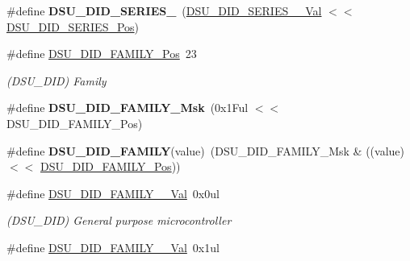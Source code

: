 \begin{DoxyCompactItemize}
\item 
\hypertarget{group___s_a_m_l21___d_s_u_ga0393d52bdee9a481f611e749fad390ec}{}\#define {\bfseries D\+S\+U\+\_\+\+D\+I\+D\+\_\+\+S\+E\+R\+I\+E\+S\+\_}~(\hyperlink{group___s_a_m_l21___d_s_u_ga5b1ab97381d29e6d852f6ef0aec8f479}{D\+S\+U\+\_\+\+D\+I\+D\+\_\+\+S\+E\+R\+I\+E\+S\+\_\+\_\+\+Val}          $<$$<$ \hyperlink{group___s_a_m_l21___d_s_u_ga7f9f64f65c0ec3d507ba5bc03b1a9b68}{D\+S\+U\+\_\+\+D\+I\+D\+\_\+\+S\+E\+R\+I\+E\+S\+\_\+\+Pos})\label{group___s_a_m_l21___d_s_u_ga0393d52bdee9a481f611e749fad390ec}

\item 
\hypertarget{group___s_a_m_l21___d_s_u_ga738ead915cfef1cb2261b900bc2125e7}{}\#define \hyperlink{group___s_a_m_l21___d_s_u_ga738ead915cfef1cb2261b900bc2125e7}{D\+S\+U\+\_\+\+D\+I\+D\+\_\+\+F\+A\+M\+I\+L\+Y\+\_\+\+Pos}~23\label{group___s_a_m_l21___d_s_u_ga738ead915cfef1cb2261b900bc2125e7}

\begin{DoxyCompactList}\small\item\em (D\+S\+U\+\_\+\+D\+I\+D) Family \end{DoxyCompactList}\item 
\hypertarget{group___s_a_m_l21___d_s_u_gafadbeccaa25afb79e44bfa3e1585c116}{}\#define {\bfseries D\+S\+U\+\_\+\+D\+I\+D\+\_\+\+F\+A\+M\+I\+L\+Y\+\_\+\+Msk}~(0x1\+Ful $<$$<$ D\+S\+U\+\_\+\+D\+I\+D\+\_\+\+F\+A\+M\+I\+L\+Y\+\_\+\+Pos)\label{group___s_a_m_l21___d_s_u_gafadbeccaa25afb79e44bfa3e1585c116}

\item 
\hypertarget{group___s_a_m_l21___d_s_u_ga60b98d79fd8846339905b75d8df68abb}{}\#define {\bfseries D\+S\+U\+\_\+\+D\+I\+D\+\_\+\+F\+A\+M\+I\+L\+Y}(value)~(D\+S\+U\+\_\+\+D\+I\+D\+\_\+\+F\+A\+M\+I\+L\+Y\+\_\+\+Msk \& ((value) $<$$<$ \hyperlink{group___s_a_m_l21___d_s_u_ga738ead915cfef1cb2261b900bc2125e7}{D\+S\+U\+\_\+\+D\+I\+D\+\_\+\+F\+A\+M\+I\+L\+Y\+\_\+\+Pos}))\label{group___s_a_m_l21___d_s_u_ga60b98d79fd8846339905b75d8df68abb}

\item 
\hypertarget{group___s_a_m_l21___d_s_u_gaa68390a3dd287f0f36e30d40994bcb1e}{}\#define \hyperlink{group___s_a_m_l21___d_s_u_gaa68390a3dd287f0f36e30d40994bcb1e}{D\+S\+U\+\_\+\+D\+I\+D\+\_\+\+F\+A\+M\+I\+L\+Y\+\_\+\_\+\+Val}~0x0ul\label{group___s_a_m_l21___d_s_u_gaa68390a3dd287f0f36e30d40994bcb1e}

\begin{DoxyCompactList}\small\item\em (D\+S\+U\+\_\+\+D\+I\+D) General purpose microcontroller \end{DoxyCompactList}\item 
\hypertarget{group___s_a_m_l21___d_s_u_gade6548ba38e36d9bd1487d02b2825f1c}{}\#define \hyperlink{group___s_a_m_l21___d_s_u_gade6548ba38e36d9bd1487d02b2825f1c}{D\+S\+U\+\_\+\+D\+I\+D\+\_\+\+F\+A\+M\+I\+L\+Y\+\_\+\_\+\+Val}~0x1ul\label{group___s_a_m_l21___d_s_u_gade6548ba38e36d9bd1487d02b2825f1c}


\end{DoxyCompactItemize}

